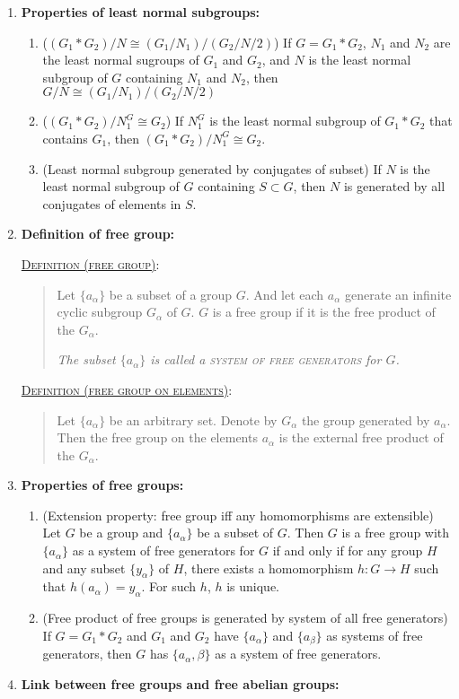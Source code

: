 \documentclass[letterpaper, 12pt]{article}
\newcommand{\defn}[2]{\textsc{\underline{Definition (#1)}:}\begin{quote} #2\end{quote}}
\begin{document}
\begin{enumerate}[resume]
            \defn{least normal subgroup}{If $S$ is a subset of $G$, the least normal subgroup of $G$ that contains $S$ is the intersection $N$ of all normal subgroups of $G$ that contain $S$.}
        \item \textbf{Properties of least normal subgroups:}
            \begin{enumerate}
            \item ($(G_1*G_2)/N\cong (G_1/N_1) / (G_2/N/2)$) If $G = G_1*G_2$, $N_1$ and $N_2$ are the least normal sugroups of $G_1$ and $G_2$, and $N$ is the least normal subgroup of $G$ containing $N_1$ and $N_2$, then $G/N \cong (G_1/N_1) / (G_2/N/2)$
            \item ($(G_1*G_2)/N_1^G\cong G_2$) If $N_1^G$ is the least normal subgroup of $G_1*G_2$ that contains $G_1$, then $(G_1*G_2)/N_1^G\cong G_2$.
            \item (Least normal subgroup generated by conjugates of subset) If $N$ is the least normal subgroup of $G$ containing $S\subset G$, then $N$ is generated by all conjugates of elements in $S$.
            \end{enumerate}
        \item \textbf{Definition of free group:}
            
            \defn{free group}{Let $\{a_\alpha\}$ be a subset of a group $G$. And let each $a_\alpha$ generate an infinite cyclic subgroup $G_\alpha$ of $G$. $G$ is a free group if it is the free product of the $G_\alpha$.

            \textit{The subset $\{a_\alpha\}$ is called a \textsc{system of free generators} for $G$.}}

            \defn{free group on elements}{Let $\{a_\alpha\}$ be an arbitrary set. Denote by $G_\alpha$ the group generated by $a_\alpha$. Then the free group on the elements $a_\alpha$ is the external free product of the $G_\alpha$.}
        \item \textbf{Properties of free groups:}
            \begin{enumerate}
            \item (Extension property: free group iff any homomorphisms are extensible) Let $G$ be a group and $\{a_\alpha\}$ be a subset of $G$. Then $G$ is a free group with $\{a_\alpha\}$ as a system of free generators for $G$ if and only if for any group $H$ and any subset $\{y_\alpha\}$ of $H$, there exists a homomorphism $h: G\to H$ such that $h(a_\alpha) = y_\alpha$. For such $h$, $h$ is unique.
            \item (Free product of free groups is generated by system of all free generators) If $G = G_1 * G_2$ and $G_1$ and $G_2$ have $\{a_\alpha\}$ and $\{a_\beta\}$ as systems of free generators, then $G$ has $\{a_\alpha,\beta\}$ as a system of free generators.
            \end{enumerate}
        \item \textbf{Link between free groups and free abelian groups:}


\end{enumerate}
\end{document}
